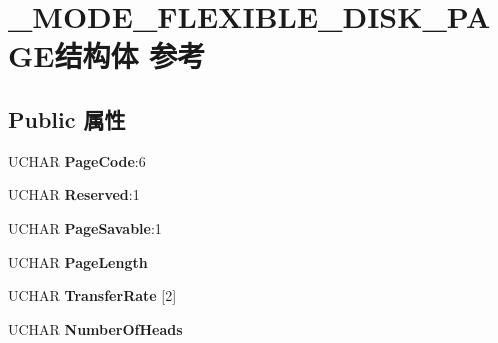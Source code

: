 \hypertarget{struct___m_o_d_e___f_l_e_x_i_b_l_e___d_i_s_k___p_a_g_e}{}\section{\+\_\+\+M\+O\+D\+E\+\_\+\+F\+L\+E\+X\+I\+B\+L\+E\+\_\+\+D\+I\+S\+K\+\_\+\+P\+A\+G\+E结构体 参考}
\label{struct___m_o_d_e___f_l_e_x_i_b_l_e___d_i_s_k___p_a_g_e}
\subsection*{Public 属性}
\begin{DoxyCompactItemize}
\item 
\mbox{\label{struct___m_o_d_e___f_l_e_x_i_b_l_e___d_i_s_k___p_a_g_e_a420b86eb9b35442ac943781cd2a5a54f}} 
U\+C\+H\+AR {\bfseries Page\+Code}\+:6
\item 
\mbox{\label{struct___m_o_d_e___f_l_e_x_i_b_l_e___d_i_s_k___p_a_g_e_ad055ac61a87bf9aaa8d2c2e1167623b4}} 
U\+C\+H\+AR {\bfseries Reserved}\+:1
\item 
\mbox{\label{struct___m_o_d_e___f_l_e_x_i_b_l_e___d_i_s_k___p_a_g_e_af934dc76967f26f4eeb6e0400fdc66f2}} 
U\+C\+H\+AR {\bfseries Page\+Savable}\+:1
\item 
\mbox{\label{struct___m_o_d_e___f_l_e_x_i_b_l_e___d_i_s_k___p_a_g_e_ac8d9947322ae2d1afa827937738e4566}} 
U\+C\+H\+AR {\bfseries Page\+Length}
\item 
\mbox{\label{struct___m_o_d_e___f_l_e_x_i_b_l_e___d_i_s_k___p_a_g_e_a43f6d08da1798fc50ef722313aa54425}} 
U\+C\+H\+AR {\bfseries Transfer\+Rate} \mbox{[}2\mbox{]}
\item 
\mbox{\label{struct___m_o_d_e___f_l_e_x_i_b_l_e___d_i_s_k___p_a_g_e_a6075e7d160b0b145740640fff5f6bfe3}} 
U\+C\+H\+AR {\bfseries Number\+Of\+Heads}

\end{DoxyCompactItemize}
